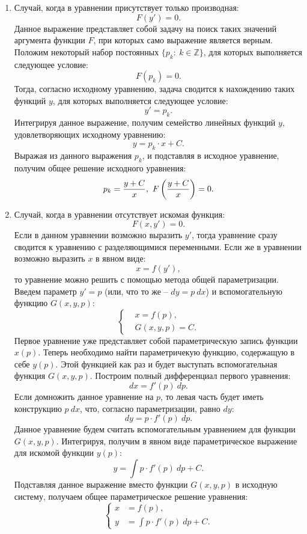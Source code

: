 	\begin{enumerate}
		\item Случай, когда в уравнении присутствует только производная:
			\[ F(y') = 0. \]
			Данное выражение представляет собой задачу на поиск таких значений аргумента функции $F$, при которых само выражение является верным. Положим некоторый набор постоянных $\{ p_k: ~ k \in \mathbb{Z} \}$, для которых выполняется следующее условие:
			\[ F(p_k) = 0. \]
			Тогда, согласно исходному уравнению, задача сводится к нахождению таких функций $y$, для которых выполняется следующее условие:
			\[ y' = p_k. \]
			Интегрируя данное выражение, получим семейство линейных функций $y$, удовлетворяющих исходному уравнению:
			\[ y = p_k \cdot x + C. \]
			Выражая из данного выражения $p_k$, и подставляя в исходное уравнение, получим общее решение исходного уравнения:
			\[ p_k = \frac{y + C}{x}, ~ F\left( \frac{y + C}{x} \right) = 0. \]

		\item Случай, когда в уравнении отсутствует искомая функция:
			\[ F(x, y') = 0. \]
			Если в данном уравнении возможно выразить $y'$, тогда уравнение сразу сводится к уравнению с разделяющимися переменными. Если же в уравнении возможно выразить $x$ в явном виде:
			\[ x = f(y'), \]
			то уравнение можно решить с помощью метода общей параметризации. Введем параметр $y' = p$ (или, что то же -- $dy = p ~ dx$) и вспомогательную функцию $G(x, y, p)$:
			\[ \left\lbrace \begin{split} &x = f(p), \\ &G(x, y, p) = C. \end{split} \right. \]
			Первое уравнение уже представляет собой параметрическую запись функции $x(p)$. Теперь необходимо найти параметричекую функцию, содержащую в себе $y(p)$. Этой функцией как раз и будет выступать вспомогательная функция $G(x, y, p)$.
			Построим полный дифференциал первого уравнения:
			\[ dx = f'(p) ~ dp. \]
			Если домножить данное уравнение на $p$, то левая часть будет иметь конструкцию $p ~ dx$, что, согласно параметризации, равно $dy$:
			\[ dy = p \cdot f'(p) ~ dp. \]
			Данное уравнение будем считать вспомогательным уравнением для функции $G(x, y, p)$. Интегрируя, получим в явном виде параметрическое выражение для искомой функции $y(p)$:
			\[ y = \int p \cdot f'(p) ~ dp + C. \]
			Подставляя данное выражение вместо функции $G(x, y, p)$ в исходную систему, получаем общее параметрическое решение уравнения:
			\[ \left\lbrace \begin{split} x &= f(p), \\ y &= \int p \cdot f'(p) ~ dp + C. \end{split} \right. \]


\end{enumerate}
